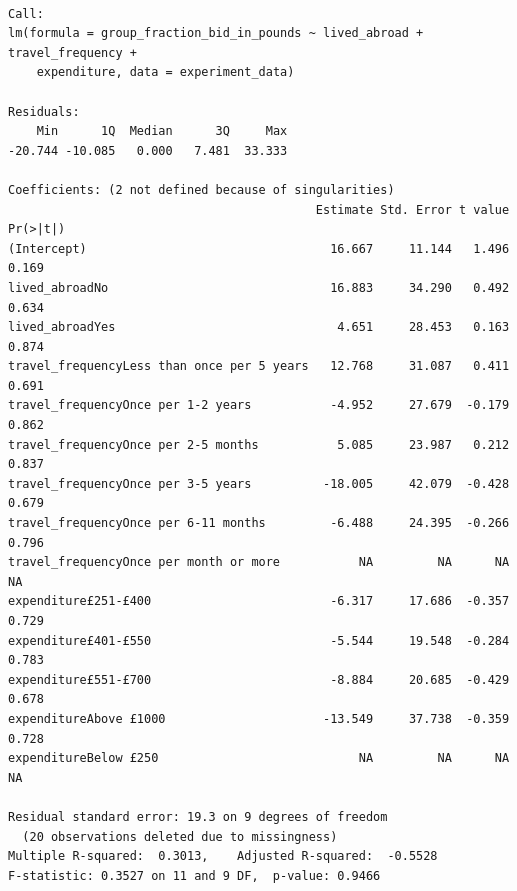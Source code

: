 \documentclass[
]{report}
\begin{document}
\begin{verbatim}

Call:
lm(formula = group_fraction_bid_in_pounds ~ lived_abroad + travel_frequency + 
    expenditure, data = experiment_data)

Residuals:
    Min      1Q  Median      3Q     Max 
-20.744 -10.085   0.000   7.481  33.333 

Coefficients: (2 not defined because of singularities)
                                           Estimate Std. Error t value Pr(>|t|)
(Intercept)                                  16.667     11.144   1.496    0.169
lived_abroadNo                               16.883     34.290   0.492    0.634
lived_abroadYes                               4.651     28.453   0.163    0.874
travel_frequencyLess than once per 5 years   12.768     31.087   0.411    0.691
travel_frequencyOnce per 1-2 years           -4.952     27.679  -0.179    0.862
travel_frequencyOnce per 2-5 months           5.085     23.987   0.212    0.837
travel_frequencyOnce per 3-5 years          -18.005     42.079  -0.428    0.679
travel_frequencyOnce per 6-11 months         -6.488     24.395  -0.266    0.796
travel_frequencyOnce per month or more           NA         NA      NA       NA
expenditure£251-£400                         -6.317     17.686  -0.357    0.729
expenditure£401-£550                         -5.544     19.548  -0.284    0.783
expenditure£551-£700                         -8.884     20.685  -0.429    0.678
expenditureAbove £1000                      -13.549     37.738  -0.359    0.728
expenditureBelow £250                            NA         NA      NA       NA

Residual standard error: 19.3 on 9 degrees of freedom
  (20 observations deleted due to missingness)
Multiple R-squared:  0.3013,    Adjusted R-squared:  -0.5528 
F-statistic: 0.3527 on 11 and 9 DF,  p-value: 0.9466
\end{verbatim}
\end{document}
